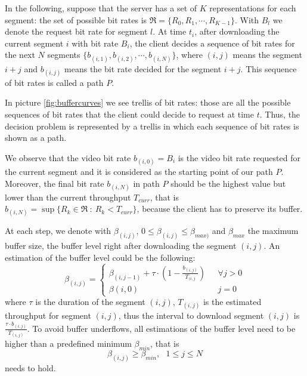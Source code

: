\documentclass[openany]{book}
\begin{document}
In the following, suppose that the server has a set of $K$ representations for each segment: the set of possible bit rates is $\mathfrak{R}=\{R_0, R_1, \cdots, R_{K-1}\}$. With $B_l$ we denote the request bit rate for segment $l$. At time $t_i$, after downloading the current segment $i$ with bit rate $B_i$, the client decides a sequence of bit rates for the next $N$ segments $\{b_{(i,1)}, b_{(i,2)}, \cdots, b_{(i,N)}\}$, where $(i,j)$ means the segment $i+j$ and $b_{(i,j)}$ means the bit rate decided for the segment $i+j$. This sequence of bit rates is called a path $P$.

In picture \ref{fig:buffercurves} we see trellis of bit rates: those are all the possible sequences of bit rates that the client could decide to request at time $t$. Thus, the decision problem is represented by a trellis in which each sequence of bit rates is shown as a path. 

We observe that the video bit rate $b_{(i,0)}=B_i$ is the video bit rate requested for the current segment and it is considered as the starting point of our path $P$. Moreover, the final bit rate $b_{(i,N)}$ in path $P$ should be the highest value but lower than the current throughput $T_{curr}$, that is $b_{(i,N)} = \sup\{R_k\in\mathfrak{R}\ :\ R_k<T_{curr}\}$, because the client has to preserve its buffer. 

At each step, we denote with $\beta_{(i,j)}$, $0\leq\beta_{(i,j)}\leq\beta_{max)}$ and $\beta_{max}$ the maximum buffer size, the buffer level right after downloading the segment $(i,j)$. An estimation of the buffer level could be the following:
\begin{equation}\label{eq:beta}
\beta_{(i,j)}=\begin{cases}
\beta_{(i,j-1)} + \tau\cdot\left(1-\frac{b_{(i,j)}}{T_{(i,j}}\right)\ \ \ &\forall j>0 \\
\beta{(i,0)} \ \ \ \ &j=0
\end{cases}
\end{equation}
where $\tau$ is the duration of the segment $(i,j)$, $T_{(i,j)}$ is the estimated throughput for segment $(i,j)$, thus the interval to download segment $(i,j)$ is $\frac{\tau\cdot b_{(i,j)}}{T_{(i,j)}}$. To avoid buffer underflows, all estimations of the buffer level need to be higher than a predefined minimum $\beta_{min}$, that is
\begin{equation}\label{eq:betamin}
\beta_{(i,j)} \geq \beta_{min},\ \ \ 1\leq j\leq N
\end{equation}
needs to hold.
\end{document}
